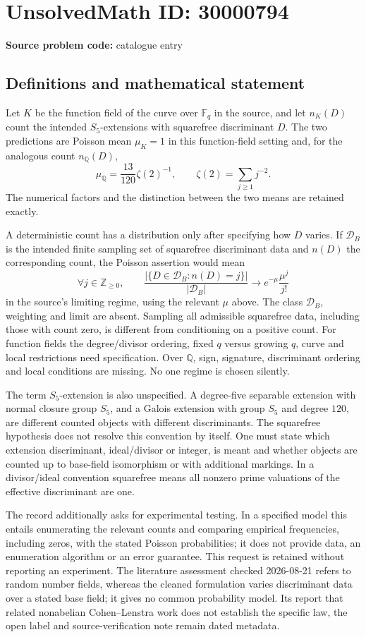 \documentclass[11pt]{article}
\newcommand{\Z}{\mathbb{Z}}
\newcommand{\Q}{\mathbb{Q}}
\newcommand{\F}{\mathbb{F}}
\begin{document}
\section*{UnsolvedMath ID: 30000794}
\textbf{Source problem code:} catalogue entry
\subsection{Definitions and mathematical statement}
Let \(K\) be the function field of the curve over \(\F_q\) in the source, and let \(n_K(D)\) count the intended \(S_5\)-extensions with squarefree discriminant \(D\). The two predictions are Poisson mean \(\mu_K=1\) in this function-field setting and, for the analogous count \(n_\Q(D)\),
\[
 \mu_\Q=\frac{13}{120}\zeta(2)^{-1},
 \qquad \zeta(2)=\sum_{j\geq1}j^{-2}.
\]
The numerical factors and the distinction between the two means are retained exactly.

A deterministic count has a distribution only after specifying how \(D\) varies. If \(\mathcal D_B\) is the intended finite sampling set of squarefree discriminant data and \(n(D)\) the corresponding count, the Poisson assertion would mean
\[
 \forall j\in\Z_{\geq0},\qquad
 \frac{|\{D\in\mathcal D_B:n(D)=j\}|}{|\mathcal D_B|}
 \longrightarrow e^{-\mu}\frac{\mu^j}{j!}
\]
in the source's limiting regime, using the relevant \(\mu\) above. The class \(\mathcal D_B\), weighting and limit are absent. Sampling all admissible squarefree data, including those with count zero, is different from conditioning on a positive count. For function fields the degree/divisor ordering, fixed \(q\) versus growing \(q\), curve and local restrictions need specification. Over \(\Q\), sign, signature, discriminant ordering and local conditions are missing. No one regime is chosen silently.

The term \(S_5\)-extension is also unspecified. A degree-five separable extension with normal closure group \(S_5\), and a Galois extension with group \(S_5\) and degree \(120\), are different counted objects with different discriminants. The squarefree hypothesis does not resolve this convention by itself. One must state which extension discriminant, ideal/divisor or integer, is meant and whether objects are counted up to base-field isomorphism or with additional markings. In a divisor/ideal convention squarefree means all nonzero prime valuations of the effective discriminant are one.

The record additionally asks for experimental testing. In a specified model this entails enumerating the relevant counts and comparing empirical frequencies, including zeros, with the stated Poisson probabilities; it does not provide data, an enumeration algorithm or an error guarantee. This request is retained without reporting an experiment. The literature assessment checked 2026-08-21 refers to random number fields, whereas the cleaned formulation varies discriminant data over a stated base field; it gives no common probability model. Its report that related nonabelian Cohen--Lenstra work does not establish the specific law, the open label and source-verification note remain dated metadata.
\end{document}
